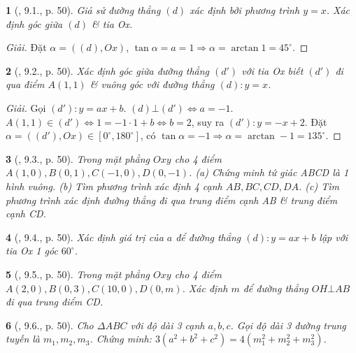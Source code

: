 \documentclass{article}
\newtheorem{baitoan}{}
\begin{document}
\begin{baitoan}[\cite{TLCT_THCS_Toan_9_dai_so}, 9.1., p. 50]
	Giả sử đường thẳng $(d)$ xác định bởi phương trình $y = x$. Xác định góc giữa $(d)$ \& tia Ox.
\end{baitoan}

\begin{proof}[Giải]
	Đặt $\alpha = ((d),Ox)$, $\tan\alpha = a = 1\Rightarrow\alpha = \arctan1 = 45^\circ$.
\end{proof}

\begin{baitoan}[\cite{TLCT_THCS_Toan_9_dai_so}, 9.2., p. 50]
	Xác định góc giữa đường thẳng $(d')$ với tia Ox biết $(d')$ đi qua điểm $A(1,1)$ \& vuông góc với đường thẳng $(d):y = x$.
\end{baitoan}

\begin{proof}[Giải]
	Gọi $(d'):y = ax + b$. $(d)\bot(d')\Leftrightarrow a = -1$. $A(1,1)\in(d')\Leftrightarrow 1 = -1\cdot1 + b\Leftrightarrow b = 2$, suy ra $(d'):y = -x + 2$. Đặt $\alpha = ((d'),Ox)\in[0^\circ,180^\circ]$, có $\tan\alpha = -1\Rightarrow\alpha = \arctan-1 = 135^\circ$.
\end{proof}

\begin{baitoan}[\cite{TLCT_THCS_Toan_9_dai_so}, 9.3., p. 50]
	Trong mặt phẳng $Oxy$ cho 4 điểm $A(1,0),B(0,1),C(-1,0),D(0,-1)$. (a) Chứng minh tứ giác ABCD là 1 hình vuông. (b) Tìm phương trình xác định 4 cạnh $AB,BC,CD,DA$. (c) Tìm phương trình xác định đường thẳng đi qua trung điểm cạnh AB \& trung điểm cạnh CD.
\end{baitoan}

\begin{baitoan}[\cite{TLCT_THCS_Toan_9_dai_so}, 9.4., p. 50]
	Xác định giá trị của $a$ để đường thẳng $(d):y = ax + b$ lập với tia Ox 1 góc $60^\circ$.
\end{baitoan}

\begin{baitoan}[\cite{TLCT_THCS_Toan_9_dai_so}, 9.5., p. 50]
	Trong mặt phẳng $Oxy$ cho 4 điểm $A(2,0),B(0,3),C(10,0),D(0,m)$. Xác định $m$ để đường thẳng $OH\bot AB$ đi qua trung điểm CD.
\end{baitoan}

\begin{baitoan}[\cite{TLCT_THCS_Toan_9_dai_so}, 9.6., p. 50]
	Cho $\Delta ABC$ với độ dài 3 cạnh $a,b,c$. Gọi độ dài 3 đường trung tuyến là $m_1,m_2,m_3$. Chứng minh: $3(a^2 + b^2 + c^2) = 4(m_1^2 + m_2^2 + m_3^2)$.
\end{baitoan}
\end{document}
